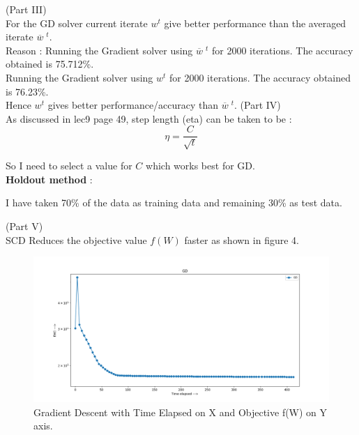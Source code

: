 \documentclass[a4paper,11pt]{article}
\begin{document}
\begin{mlsolution}

(Part III)\\

For the GD solver current iterate $w^{t}$ give better performance than the averaged iterate $\overline{w}\;^t$.\\

Reason : Running the Gradient solver using $\overline{w}\;^t$ for 2000 iterations. The accuracy obtained is 75.712\;\%.\\

Running the Gradient solver using $w^{t}$ for 2000 iterations. The accuracy obtained is 76.23\;\%.\\

Hence $w^{t}$ gives better performance/accuracy than $\overline{w}\;^t$.
\newpage
(Part IV)\\

As discussed in lec9 page 49, step length (eta) can be taken to be :
\[
\eta = \frac{C}{\sqrt{t}}
\]

So I need to select a value for $C$ which works best for GD.\\

\textbf{Holdout method} :

I have taken 70\;\% of the data as training data and remaining 30\;\% as test data.

\newpage
(Part V)\\

SCD Reduces the objective value $f(W)$ faster as shown in figure 4.

\begin{figure}[th]%
\centering
\includegraphics[width=1.2\columnwidth]{GD-elapsed.png}%

\caption{Gradient Descent with Time Elapsed on X and Objective f(W) on Y axis.}%
\label{fig:GD1}%
\end{figure}


\end{mlsolution}
\end{document}
